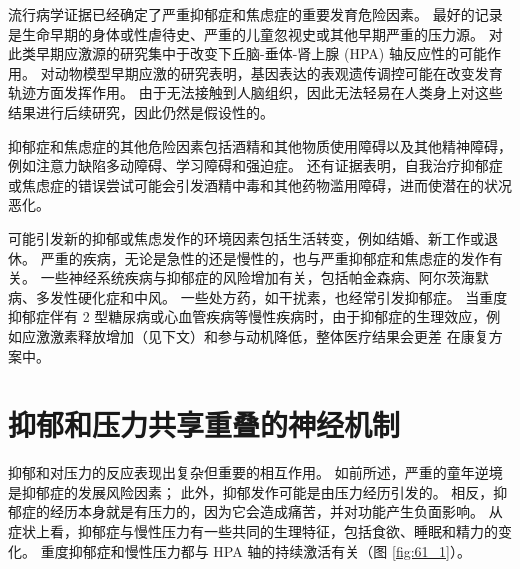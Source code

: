 流行病学证据已经确定了严重抑郁症和焦虑症的重要发育危险因素。 最好的记录是生命早期的身体或性虐待史、严重的儿童忽视史或其他早期严重的压力源。 对此类早期应激源的研究集中于改变下丘脑-垂体-肾上腺 (HPA) 轴反应性的可能作用。 对动物模型早期应激的研究表明，基因表达的表观遗传调控可能在改变发育轨迹方面发挥作用。 由于无法接触到人脑组织，因此无法轻易在人类身上对这些结果进行后续研究，因此仍然是假设性的。

抑郁症和焦虑症的其他危险因素包括酒精和其他物质使用障碍以及其他精神障碍，例如注意力缺陷多动障碍、学习障碍和强迫症。 还有证据表明，自我治疗抑郁症或焦虑症的错误尝试可能会引发酒精中毒和其他药物滥用障碍，进而使潜在的状况恶化。

可能引发新的抑郁或焦虑发作的环境因素包括生活转变，例如结婚、新工作或退休。 严重的疾病，无论是急性的还是慢性的，也与严重抑郁症和焦虑症的发作有关。 一些神经系统疾病与抑郁症的风险增加有关，包括帕金森病、阿尔茨海默病、多发性硬化症和中风。 一些处方药，如干扰素，也经常引发抑郁症。 当重度抑郁症伴有 2 型糖尿病或心血管疾病等慢性疾病时，由于抑郁症的生理效应，例如应激激素释放增加（见下文）和参与动机降低，整体医疗结果会更差 在康复方案中。

\section{抑郁和压力共享重叠的神经机制}
抑郁和对压力的反应表现出复杂但重要的相互作用。 如前所述，严重的童年逆境是抑郁症的发展风险因素； 此外，抑郁发作可能是由压力经历引发的。 相反，抑郁症的经历本身就是有压力的，因为它会造成痛苦，并对功能产生负面影响。 从症状上看，抑郁症与慢性压力有一些共同的生理特征，包括食欲、睡眠和精力的变化。 重度抑郁症和慢性压力都与 HPA 轴的持续激活有关（图 \ref{fig:61_1}）。

